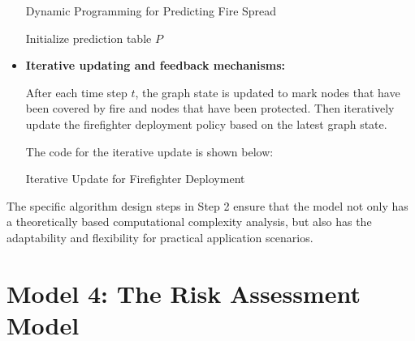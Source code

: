 \documentclass[12pt]{article}  %
\begin{document}
\begin{itemize}
	\noindent\hspace{-2em}
	\begin{algorithm}[H]
		\DontPrintSemicolon %
		\caption{Dynamic Programming for Predicting Fire Spread}
		\BlankLine
		\SetAlgoLined %
		Initialize prediction table $P$\;
	\end{algorithm}
	
	\item \textbf{Iterative updating and feedback mechanisms:} 
	
	After each time step $t$, the graph state is updated to mark nodes that have been covered by fire and nodes that have been protected.	Then iteratively update the firefighter deployment policy based on the latest graph state.
	
	The code for the iterative update is shown below:
	
	\noindent\hspace{-2em}
	\begin{algorithm}[H]
		\DontPrintSemicolon %
		\caption{Iterative Update for Firefighter Deployment}
		\BlankLine
		\SetAlgoLined %
	\end{algorithm}
	
\end{itemize}
  
 The specific algorithm design steps in Step 2 ensure that the model not only has a theoretically based computational complexity analysis, but also has the adaptability and flexibility for practical application scenarios.
 
 \section{Model 4: The Risk Assessment Model}
  
\end{document}
